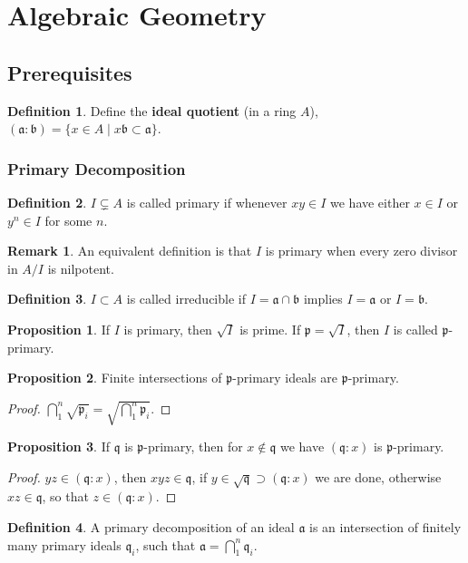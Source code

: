 \documentclass[11pt]{article}
\theoremstyle{definition}
\newtheorem{defn}{Definition}
\newtheorem{prop}{Proposition}
\newtheorem*{rmk}{Remark}
\newcommand{\set}[1]{\{#1\}}
\newcommand{\tor}{\text{ or }}
\begin{document}
    \newpage
    \section{Algebraic Geometry}
    \subsection{Prerequisites}
    \begin{defn}
        Define the \textbf{ideal quotient} (in a ring \(A\)), \((\mathfrak{a}:\mathfrak{b}) = \set{x \in A \mid x\mathfrak{b} \subset \mathfrak{a}}\).
    \end{defn}
    \subsubsection{Primary Decomposition}
    \begin{defn}
        \(I \subsetneq A\) is called primary if whenever \(xy \in I\) we have either \(x \in I\) or \(y^n \in I\) for some \(n\).
    \end{defn}
    \begin{rmk}
        An equivalent definition is that \(I\) is primary when every zero divisor in \(A/I\) is nilpotent.
    \end{rmk}
    \begin{defn}
        \(I \subset A\) is called irreducible if \(I = \mathfrak{a}\cap\mathfrak{b}\) implies \(I = \mathfrak{a} \tor I = \mathfrak{b}.\)
    \end{defn}
    \begin{prop}
        If \(I\) is primary, then \(\sqrt{I}\) is prime. If \(\mathfrak{p} = \sqrt{I}\), then \(I\) is called \(\mathfrak{p}\)-primary.
    \end{prop}
    \begin{prop}
        Finite intersections of \(\mathfrak{p}\)-primary ideals are \(\mathfrak{p}\)-primary.
        \begin{proof}
            \(\bigcap_1^n \sqrt{\mathfrak{p}_i} = \sqrt{\bigcap_1^n \mathfrak{p}_i}\).
        \end{proof}
    \end{prop}
    \begin{prop}
        If \(\mathfrak{q}\) is \(\mathfrak{p}\)-primary, then for \(x \not \in \mathfrak{q}\) we have \((\mathfrak{q}:x)\) is \(\mathfrak{p}\)-primary.

        \begin{proof}
            \(yz \in (\mathfrak{q}:x)\), then \(xyz \in \mathfrak{q}\), if \(y \in \sqrt{\mathfrak{q}} \supset (\mathfrak{q}:x)\) we are done, otherwise \(xz \in \mathfrak{q}\), so that \(z \in (\mathfrak{q}:x)\).
        \end{proof}
    \end{prop}
    \begin{defn}
        A primary decomposition of an ideal \(\mathfrak{a}\) is an intersection of finitely many primary ideals \(\mathfrak{q}_i\), such that \(\mathfrak{a} = \bigcap_1^n \mathfrak{q}_i\).
    \end{defn}
\end{document}
